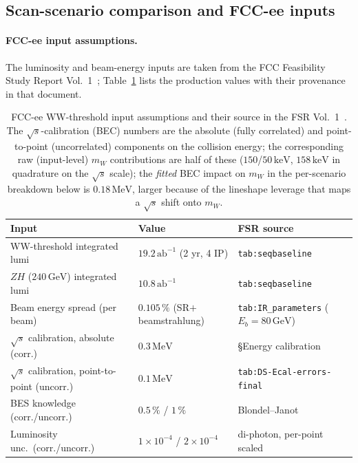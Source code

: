 \documentclass[11pt,a4paper]{article}
\newcommand{\mW}{m_W}
\newcommand{\GeV}{\ensuremath{\,\mathrm{GeV}}}
\newcommand{\MeV}{\ensuremath{\,\mathrm{MeV}}}
\begin{document}
\subsection{Scan-scenario comparison and FCC-ee inputs}\label{sec:val-scenarios}

\paragraph{FCC-ee input assumptions.}
The luminosity and beam-energy inputs are taken from the FCC Feasibility
Study Report Vol.~1~\cite{FCCFSR2025}; Table~\ref{tab:fcc-inputs} lists
the production values with their provenance in that document.

\begin{table}[h]
\centering
\caption{FCC-ee WW-threshold input assumptions and their source in the FSR
Vol.~1~\cite{FCCFSR2025}. The $\sqrt s$-calibration (BEC) numbers are the
absolute (fully correlated) and point-to-point (uncorrelated) components on
the collision energy; the corresponding raw (input-level) $\mW$ contributions are half of
these ($150$/$50\,\text{keV}$, $158\,\text{keV}$ in quadrature on the
$\sqrt s$ scale); the \emph{fitted} BEC impact on $\mW$ in the
per-scenario breakdown below is $0.18\MeV$, larger because of the
lineshape leverage that maps a $\sqrt s$ shift onto $\mW$.}
\label{tab:fcc-inputs}
\begin{tabular}{l l l}
\toprule
Input & Value & FSR source \\
\midrule
WW-threshold integrated lumi & $19.2\,\text{ab}^{-1}$ (2 yr, 4 IP) & \texttt{tab:seqbaseline} \\
$ZH$ ($240\GeV$) integrated lumi & $10.8\,\text{ab}^{-1}$ & \texttt{tab:seqbaseline} \\
Beam energy spread (per beam) & $0.105\,\%$ (SR$+$beamstrahlung) & \texttt{tab:IR\_parameters} ($E_b=80\GeV$) \\
$\sqrt s$ calibration, absolute (corr.) & $0.3\MeV$ & §Energy calibration \\
$\sqrt s$ calibration, point-to-point (uncorr.) & $0.1\MeV$ & \texttt{tab:DS-Ecal-errors-final} \\
BES knowledge (corr./uncorr.) & $0.5\,\%$ / $1\,\%$ & Blondel--Janot~\cite{BlondelJanot} \\
Luminosity unc.\ (corr./uncorr.) & $1\!\times\!10^{-4}$ / $2\!\times\!10^{-4}$ & di-photon, per-point scaled~\cite{LumiDiphoton} \\
\bottomrule
\end{tabular}
\end{table}
\end{document}
